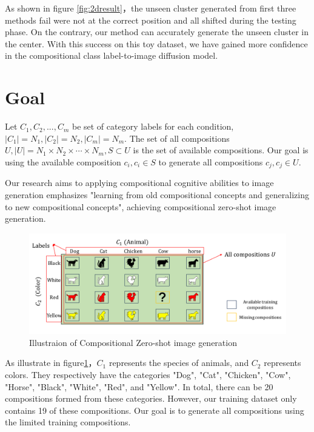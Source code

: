 As shown in figure \ref{fig:2dresult}，the unseen cluster generated from first three methods fail were not at the correct position and all shifted during the testing phase. On the contrary, our method can accurately generate the unseen cluster in the center. With this success on this toy dataset, we have gained more confidence in the compositional class label-to-image diffusion model.



\section{Goal}
Let $C_1, C_2, ..., C_m$ be set of category labels for each condition, $|C_1| = N_1, |C_2| = N_2, |C_m| = N_m$. The set of all compositions $U, |U| = N_1 \times N_2 \times \cdots \times N_m, S \subset U$  is the set of available compositions. Our goal is using the available composition $c_i, c_i \in S$ to generate all compositions $c_j, c_j \in U$.

Our research aims to applying compositional cognitive abilities to image generation emphasizes "learning from old compositional concepts and generalizing to new compositional concepts", achieving compositional zero-shot image generation.
\begin{figure} [H]
    \centering
    \includegraphics[width=1\linewidth]{figures/goal.pdf}
    \caption{Illustraion of Compositional Zero-shot image generation}
    \label{fig:compositional zero shot}
\end{figure}

As illustrate in figure\ref{fig:compositional zero shot}，$C_1$ represents the species of animals, and $C_2$ represents colors. They respectively have the categories "Dog", "Cat", "Chicken", "Cow", "Horse", "Black", "White", "Red", and "Yellow". In total, there can be 20 compositions formed from these categories. However, our training dataset only contains 19 of these compositions. Our goal is to generate all compositions using the limited training compositions.


